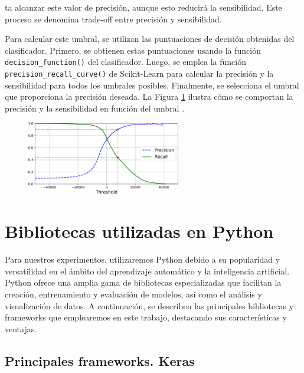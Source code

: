 ta alcanzar este valor de precisión, aunque esto reducirá la sensibilidad. Este proceso se denomina trade-off entre precisión y sensibilidad.

Para calcular este umbral, se utilizan las puntuaciones de decisión obtenidas del clasificador. Primero, se obtienen estas puntuaciones usando la función \lstinline|decision_function()| del clasificador. Luego, se emplea la función \lstinline|precision_recall_curve()| de Scikit-Learn para calcular la precisión y la sensibilidad para todos los umbrales posibles. Finalmente, se selecciona el umbral que proporciona la precisión deseada. La Figura \ref{img: pr_vs_threshold} ilustra cómo se comportan la precisión y la sensibilidad en función del umbral \citep{geron2022hands}.

\begin{figure}[h]
	\centering
    \includegraphics[width=0.6\textwidth]{img/precision_recall_vs_threshold.png}
    \label{img: pr_vs_threshold}
\end{figure}


\section{Bibliotecas utilizadas en Python} \label{Subsec: 3_3}

Para nuestros experimentos, utilizaremos Python debido a su popularidad y versatilidad en el ámbito del aprendizaje automático y la inteligencia artificial. Python ofrece una amplia gama de bibliotecas especializadas que facilitan la creación, entrenamiento y evaluación de modelos, así como el análisis y visualización de datos. A continuación, se describen las principales bibliotecas y frameworks que emplearemos en este trabajo, destacando sus características y ventajas.


\subsection{Principales frameworks. Keras}

